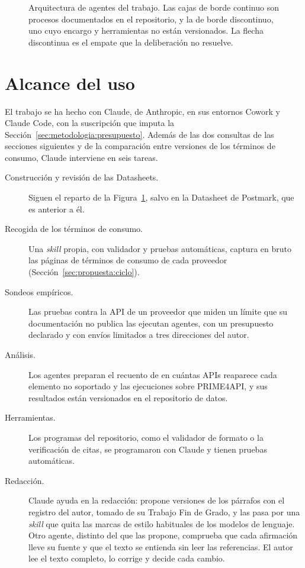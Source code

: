 \begin{figure}[H]
\endgroup
\caption[Arquitectura de agentes del trabajo]{Arquitectura de agentes del trabajo. Las cajas de borde continuo son procesos documentados en el repositorio, y la de borde discontinuo, uno cuyo encargo y herramientas no están versionados. La flecha discontinua es el empate que la deliberación no resuelve.}
\label{fig:uso-ia:agentes}
\end{figure}

\section{Alcance del uso}

El trabajo se ha hecho con Claude, de Anthropic, en sus entornos Cowork y Claude Code, con la suscripción que imputa la Sección~\ref{sec:metodologia:presupuesto}.
Además de las dos consultas de las secciones siguientes y de la comparación entre versiones de los términos de consumo, Claude interviene en seis tareas.

\begin{description}
  \item[Construcción y revisión de las Datasheets.] Siguen el reparto de la Figura~\ref{fig:uso-ia:agentes}, salvo en la Datasheet de Postmark, que es anterior a él.
  \item[Recogida de los términos de consumo.] Una \textit{skill} propia, con validador y pruebas automáticas, captura en bruto las páginas de términos de consumo de cada proveedor (Sección~\ref{sec:propuesta:ciclo}).
  \item[Sondeos empíricos.] Las pruebas contra la API de un proveedor que miden un límite que su documentación no publica las ejecutan agentes, con un presupuesto declarado y con envíos limitados a tres direcciones del autor.
  \item[Análisis.] Los agentes preparan el recuento de en cuántas APIs reaparece cada elemento no soportado y las ejecuciones sobre PRIME4API, y sus resultados están versionados en el repositorio de datos.
  \item[Herramientas.] Los programas del repositorio, como el validador de formato o la verificación de citas, se programaron con Claude y tienen pruebas automáticas.
  \item[Redacción.] Claude ayuda en la redacción: propone versiones de los párrafos con el registro del autor, tomado de su Trabajo Fin de Grado, y las pasa por una \textit{skill} que quita las marcas de estilo habituales de los modelos de lenguaje. Otro agente, distinto del que las propone, comprueba que cada afirmación lleve su fuente y que el texto se entienda sin leer las referencias. El autor lee el texto completo, lo corrige y decide cada cambio.
\end{description}

